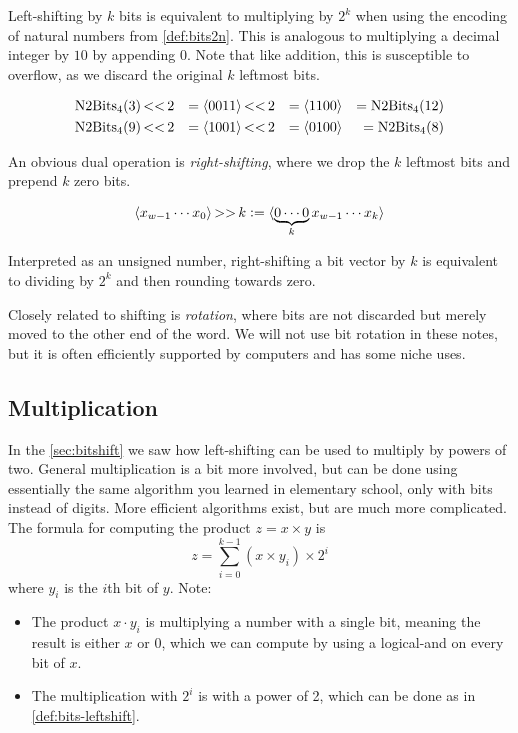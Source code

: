 Left-shifting by $k$ bits is equivalent to multiplying by $2^{k}$ when
using the encoding of natural numbers from \cref{def:bits2n}.  This is
analogous to multiplying a decimal integer by $10$ by appending $0$.
Note that like addition, this is susceptible to overflow, as we
discard the original $k$ leftmost bits.

\begin{example}[Left-shifting bit vectors with $w=4$]
  \begin{align}
    \mathrm{N2Bits}_{4}(3) \operatorname{<<} 2 &&= \langle 0011 \rangle \operatorname{<<} 2 &&= \langle 1100 \rangle &&= \mathrm{N2Bits}_{4}(12) \\
    \mathrm{N2Bits}_{4}(9) \operatorname{<<} 2 &&= \langle 1001 \rangle \operatorname{<<} 2 &&= \langle 0100 \rangle &&= \mathrm{N2Bits}_{4}(8)
  \end{align}
\end{example}

An obvious dual operation is \emph{right-shifting}, where we drop the
$k$ leftmost bits and prepend $k$ zero bits.

\begin{definition}
  \begin{align*}
    \langle x_{w-1}\cdots{}x_{0} \rangle \operatorname{>>} k \vcentcolon=
    \langle \underbrace{0 \cdots 0}_{k} x_{w-1}\cdots{}x_{k} \rangle
  \end{align*}
  \label{def:bits-rightshift-logical}
\end{definition}

Interpreted as an unsigned number, right-shifting a bit vector by $k$
is equivalent to dividing by $2^{k}$ and then rounding towards zero.

Closely related to shifting is \emph{rotation}, where bits are not
discarded but merely moved to the other end of the word.  We will not
use bit rotation in these notes, but it is often efficiently supported
by computers and has some niche uses.

\subsection{Multiplication}
\label{sec:bit-multiplication}

In the \cref{sec:bitshift} we saw how left-shifting can be used to
multiply by powers of two.  General multiplication is a bit more
involved, but can be done using essentially the same algorithm you
learned in elementary school, only with bits instead of digits.  More
efficient algorithms exist, but are much more complicated.  The
formula for computing the product $z=x\times{}y$ is
\begin{equation}
  z = \sum_{i=0}^{k-1} (x \times y_{i}) \times 2^{i}
\end{equation}
where $y_{i}$ is the $i$th bit of $y$.  Note:
\begin{itemize}
\item The product $x \cdot y_{i}$ is multiplying a number with a
  single bit, meaning the result is either $x$ or $0$, which we can
  compute by using a logical-and on every bit of $x$.
\item The multiplication with $2^{i}$ is with a power of 2, which can
  be done as in \cref{def:bits-leftshift}.
\end{itemize}

